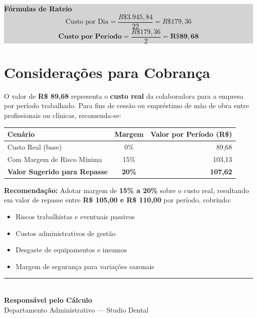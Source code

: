 \documentclass[12pt, a4paper]{article}
\newcommand{\reais}[1]{R\$ #1}
\begin{document}
\colorbox{lightGray}{%
    \parbox{\textwidth}{%
        \vspace{0.5cm}
        \centering
        {\large \textbf{Fórmulas de Rateio}} \\
        \vspace{0.5cm}
        \[ \text{Custo por Dia} = \frac{\reais{3.945,84}}{22} = \reais{179,36} \]
        \vspace{0.3cm}
        \[ \boxed{\textbf{Custo por Período} = \frac{\reais{179,36}}{2} = \mathbf{\reais{89,68}}} \]
        \vspace{0.3cm}
    }%
}

\section{Considerações para Cobrança}

O valor de \textbf{\reais{89,68}} representa o \textbf{custo real} da colaboradora para a empresa por período trabalhado. Para fins de cessão ou empréstimo de mão de obra entre profissionais ou clínicas, recomenda-se:

\begin{table}[H]
    \centering
    \renewcommand{\arraystretch}{1.5}
    \begin{tabularx}{\textwidth}{X c r}
        \toprule
        \rowcolor{tableHeader} \textbf{Cenário} & \textbf{Margem} & \textbf{Valor por Período (R\$)} \\
        \midrule
        Custo Real (base) & 0\% & 89,68 \\
        \rowcolor{lightGray}
        Com Margem de Risco Mínima & 15\% & 103,13 \\
        \textcolor{successGreen}{\textbf{Valor Sugerido para Repasse}} & \textcolor{successGreen}{\textbf{20\%}} & \textcolor{successGreen}{\textbf{107,62}} \\
        \bottomrule
    \end{tabularx}
\end{table}

\newpage
\textcolor{accentColor}{\textbf{Recomendação:}} Adotar margem de \textbf{15\% a 20\%} sobre o custo real, resultando em valor de repasse entre \textbf{\reais{105,00} e \reais{110,00}} por período, cobrindo:

\begin{itemize}
    \item Riscos trabalhistas e eventuais passivos
    \item Custos administrativos de gestão
    \item Desgaste de equipamentos e insumos
    \item Margem de segurança para variações sazonais
\end{itemize}

\vspace{2cm}

\begin{center}
    \rule{8cm}{0.5pt} \\
    \vspace{0.3cm}
    \textbf{Responsável pelo Cálculo} \\
    \textcolor{secondaryText}{\small Departamento Administrativo --- Studio Dental}
\end{center}
\end{document}
